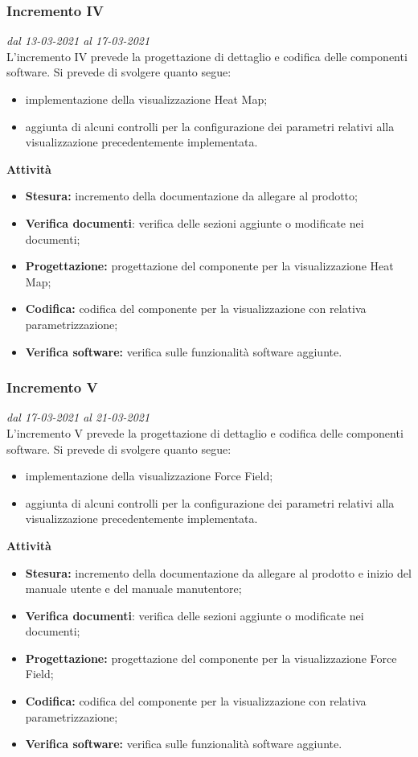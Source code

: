 \subsubsection{Incremento IV}
\textit{dal 13-03-2021 al 17-03-2021}\\
L'incremento IV prevede la progettazione di dettaglio e codifica delle componenti software. Si prevede di svolgere quanto segue:
\begin{itemize}
\item implementazione della visualizzazione Heat Map;
\item aggiunta di alcuni controlli per la configurazione dei parametri relativi alla visualizzazione precedentemente implementata.
\end{itemize}
\textbf{Attività}
\begin{itemize}
\item \textbf{Stesura:} incremento della documentazione da allegare al prodotto;
\item \textbf{Verifica documenti}: verifica delle sezioni aggiunte o modificate nei documenti;
\item \textbf{Progettazione:} progettazione del componente per la visualizzazione Heat Map;
\item \textbf{Codifica:} codifica del componente per la visualizzazione con relativa parametrizzazione;
\item \textbf{Verifica software:} verifica sulle funzionalità software aggiunte.
\end{itemize}

\subsubsection{Incremento V}
\textit{dal 17-03-2021 al 21-03-2021}\\
L'incremento V prevede la progettazione di dettaglio e codifica delle componenti software. Si prevede di svolgere quanto segue:
\begin{itemize}
\item implementazione della visualizzazione Force Field;
\item aggiunta di alcuni controlli per la configurazione dei parametri relativi alla visualizzazione precedentemente implementata.
\end{itemize}
\textbf{Attività}
\begin{itemize}
\item \textbf{Stesura:} incremento della documentazione da allegare al prodotto e inizio del manuale utente e del manuale manutentore;
\item \textbf{Verifica documenti}: verifica delle sezioni aggiunte o modificate nei documenti;
\item \textbf{Progettazione:} progettazione del componente per la visualizzazione Force Field;
\item \textbf{Codifica:} codifica del componente per la visualizzazione con relativa parametrizzazione;
\item \textbf{Verifica software:} verifica sulle funzionalità software aggiunte.
\end{itemize}

